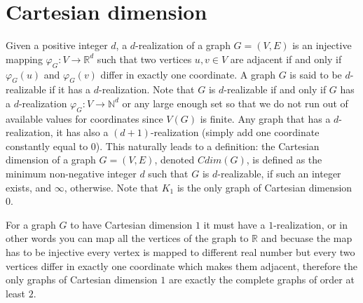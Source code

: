 \documentclass[12pt,a4paper,titlepage,openany]{report}
\begin{document}
\chapter{Cartesian dimension}
Given a positive integer $d$, a $d$-realization of a graph $G=(V,E)$ is an injective mapping $\varphi_G:V\to \mathbb{R}^d$ such that two vertices $u, v \in V$ are adjacent if and only if $\varphi_G(u)$ and $\varphi_G(v)$ differ in exactly one coordinate. A graph $G$ is said to be $d$-realizable if it has a $d$-realization. Note that $G$ is $d$-realizable if and only if $G$ has a $d$-realization $\varphi_G : V \rightarrow \mathbb{N}^d$ or any large enough set so that we do not run out of available values for coordinates since $V(G)$ is finite.\newline
Any graph that has a $d$-realization, it has also a $(d+1)$-realization (simply add one coordinate constantly equal to $0$). This naturally leads to a definition: the Cartesian dimension of a graph $G = (V, E)$, denoted $Cdim(G)$, is defined as the minimum non-negative integer $d$ such that $G$ is $d$-realizable, if such an integer exists, and $\infty$, otherwise. Note that $K_1$ is the only graph of Cartesian dimension 0.\newline

For a graph $G$ to have Cartesian dimension $1$ it must have a $1$-realization, or in other words you can map all the vertices of the graph to $\mathbb{R}$ and becuase the map has to be injective every vertex is mapped to different real number but every two vertices differ in exactly one coordinate which makes them adjacent, therefore the only graphs of Cartesian dimension $1$ are exactly the complete graphs of order at least $2$.
\end{document}
